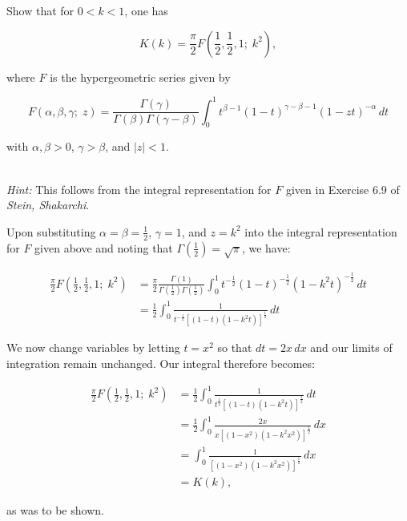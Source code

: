 Show that for $0 < k < 1$, one has

$$
K(k) = \frac{\pi}{2} F \left(\frac{1}{2}, \frac{1}{2}, 1; \; k^2 \right),
$$

where $F$ is the hypergeometric series given by

$$
F(\alpha, \beta, \gamma; \; z) = \frac{\Gamma(\gamma)}{\Gamma(\beta)\Gamma(\gamma - \beta)} 
                                 \int_0^1 t^{\beta - 1} (1 - t)^{\gamma - \beta - 1} (1 - zt)^{-\alpha} \, dt
$$

with $\alpha, \beta > 0$, $\gamma > \beta$, and $|z| < 1$. 

\ \\
\textit{Hint:} This follows from the integral representation for $F$ given in Exercise 6.9 of \textit{Stein, Shakarchi}.

\begin{solution}
  Upon substituting $\alpha = \beta = \frac{1}{2}$, $\gamma = 1$, and $z = k^2$ into the integral representation for $F$ 
  given above and noting that $\Gamma\left(\frac{1}{2}\right) = \sqrt{\pi}$, we have:

  \begin{align*}
  \frac{\pi}{2} F \left(\frac{1}{2}, \frac{1}{2}, 1; \; k^2 \right) 
    &= \frac{\pi}{2} \frac{\Gamma(1)}{\Gamma\left(\frac{1}{2}\right)\Gamma\left(\frac{1}{2}\right)} 
       \int_0^1 t^{-\frac{1}{2}} (1 - t)^{-\frac{1}{2}} (1 - k^2 t)^{-\frac{1}{2}} \, dt \\
    &= \frac{1}{2} \int_0^1 \frac{1}{t^{-\frac{1}{2}} \left[(1 - t)(1 - k^2 t)\right]^{\frac{1}{2}}} \, dt
  \end{align*}

  We now change variables by letting $t = x^2$ so that $dt = 2x \, dx$ and our limits of integration remain unchanged. 
  Our integral therefore becomes:

  \begin{align*}
  \frac{\pi}{2} F \left(\frac{1}{2}, \frac{1}{2}, 1; \; k^2 \right) 
    &= \frac{1}{2} \int_0^1 \frac{1}{t^{\frac{1}{2}} \left[(1 - t)(1 - k^2 t)\right]^{\frac{1}{2}}} \, dt \\
    &= \frac{1}{2} \int_0^1 \frac{2 x}{x \left[(1 - x^2)(1 - k^2 x^2)\right]^{\frac{1}{2}}} \, dx \\
    &= \int_0^1 \frac{1}{\left[(1 - x^2)(1 - k^2 x^2)\right]^{\frac{1}{2}}} \, dx \\
    &= K(k),
  \end{align*}

  as was to be shown.
  \ \\
\end{solution}